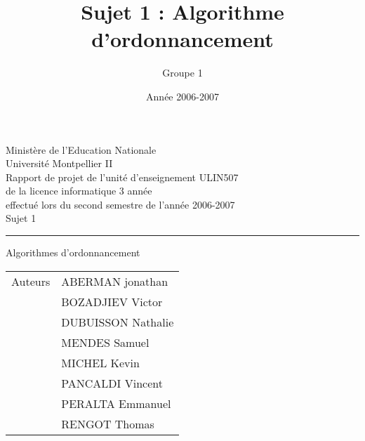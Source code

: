 \documentclass[A4]{report}
\title{Sujet 1 : Algorithme d'ordonnancement}
\author{Groupe 1}
\date{Année 2006-2007}
\theoremstyle{remark}
\newcommand{\sups}[1]{\raisebox{1ex}{\small #1}}
\begin{document}
\begin{titlepage}
\begin{center}
{\large
Ministère de l'Education Nationale \\
\vspace{0.8cm}
Université Montpellier II \\
\vspace{1.5cm}
Rapport de projet de l'unité d'enseignement ULIN507 \\
de la licence informatique 3\sups{ème} année \\
effectué lors du second semestre de l'année 2006-2007 \\
}
\vspace{4cm}
{\huge Sujet 1 }\\
\vspace{0.2cm}
\hrule
\vspace{0.2cm}
{\Huge Algorithmes d'ordonnancement}
\vspace{7cm}
\end{center}
\begin{flushright}
{\raggedleft
\begin{tabular}{r|l}
Auteurs & ABERMAN jonathan \\
& BOZADJIEV Victor \\
& DUBUISSON Nathalie \\
& MENDES Samuel \\
& MICHEL Kevin \\
& PANCALDI Vincent \\
& PERALTA Emmanuel \\
& RENGOT Thomas \\
\end{tabular}
}
\end{flushright}
\end{titlepage}
\tableofcontents



	
	
	
\end{document}
